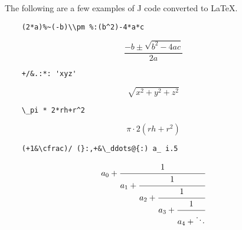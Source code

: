 \documentclass{article}
\begin{document}
The following are a few examples of J code converted to LaTeX.
\begin{lstlisting}
    (2*a)%~(-b)\\pm %:(b^2)-4*a*c
\end{lstlisting}
\[\frac{-b \pm \sqrt{b^2-4 a c}}{2 a}\]
\begin{lstlisting}
    +/&.:*: 'xyz'
\end{lstlisting}
\[\sqrt{x^2+y^2+z^2}\]
\begin{lstlisting}
    \_pi * 2*rh+r^2
\end{lstlisting}
\[\pi\cdot 2 \left(rh+r^2\right)\]
\begin{lstlisting}
    (+1&\cfrac)/ (}:,+&\_ddots@{:) a_ i.5
\end{lstlisting}
\[a_0+\cfrac{1}{a_1+\cfrac{1}{a_2+\cfrac{1}{a_3+\cfrac{1}{a_4+\ddots}}}}\]
\end{document}
